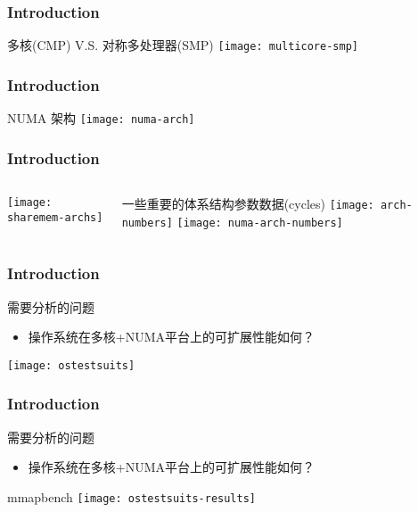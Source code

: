 \begin{frame}[plain]	
	\frametitle{Introduction}
	\centering \Large
	多核(CMP) V.S. 对称多处理器(SMP)
	\texttt{[image: multicore-smp]}
\end{frame}


\begin{frame}[plain]	
	\frametitle{Introduction}
	\Large
		NUMA 架构
	\texttt{[image: numa-arch]}


\end{frame}

\begin{frame}[plain]	
	\frametitle{Introduction}

	
		\begin{columns}
		
		\begin{column}{.4\textwidth}
			\texttt{[image: sharemem-archs]}
		\end{column}
		\begin{column}{.6\textwidth}
				\Large \centering
			一些重要的体系结构参数数据(cycles)
			\texttt{[image: arch-numbers]}
			\texttt{[image: numa-arch-numbers]}
		\end{column}
	\end{columns}
	
\end{frame}





\begin{frame}[plain]	
	\frametitle{Introduction}
	需要分析的问题
\begin{itemize}
	\item 操作系统在多核+NUMA平台上的可扩展性能如何？
\end{itemize}	
\texttt{[image: ostestsuits]}
	
\end{frame}

\begin{frame}[plain]	
	\frametitle{Introduction}
	需要分析的问题
	\begin{itemize}
		\item 操作系统在多核+NUMA平台上的可扩展性能如何？
	\end{itemize}	
	mmapbench
	\texttt{[image: ostestsuits-results]}
	
\end{frame}


